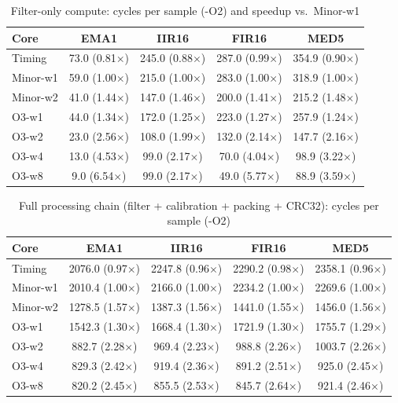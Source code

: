 \documentclass[12pt, a4paper]{article}
\begin{document}
\begin{table}[h!]
\centering
\caption{Filter-only compute: cycles per sample (-O2) and speedup vs.\ Minor-w1}
\vspace{0.2cm}
\begin{tabular}{@{}lcccc@{}}
\toprule
\textbf{Core} & \textbf{EMA1} & \textbf{IIR16} & \textbf{FIR16} & \textbf{MED5} \\ \midrule
Timing   & 73.0 (0.81$\times$) & 245.0 (0.88$\times$) & 287.0 (0.99$\times$) & 354.9 (0.90$\times$) \\
Minor-w1 & 59.0 (1.00$\times$) & 215.0 (1.00$\times$) & 283.0 (1.00$\times$) & 318.9 (1.00$\times$) \\
Minor-w2 & 41.0 (1.44$\times$) & 147.0 (1.46$\times$) & 200.0 (1.41$\times$) & 215.2 (1.48$\times$) \\
O3-w1    & 44.0 (1.34$\times$) & 172.0 (1.25$\times$) & 223.0 (1.27$\times$) & 257.9 (1.24$\times$) \\
O3-w2    & 23.0 (2.56$\times$) & 108.0 (1.99$\times$) & 132.0 (2.14$\times$) & 147.7 (2.16$\times$) \\
O3-w4    & 13.0 (4.53$\times$) &  99.0 (2.17$\times$) &  70.0 (4.04$\times$) &  98.9 (3.22$\times$) \\
O3-w8    &  9.0 (6.54$\times$) &  99.0 (2.17$\times$) &  49.0 (5.77$\times$) &  88.9 (3.59$\times$) \\ \bottomrule
\end{tabular}
\end{table}

\begin{table}[h!]
\centering
\caption{Full processing chain (filter + calibration + packing + CRC32): cycles per sample (-O2)}
\vspace{0.2cm}
\begin{tabular}{@{}lcccc@{}}
\toprule
\textbf{Core} & \textbf{EMA1} & \textbf{IIR16} & \textbf{FIR16} & \textbf{MED5} \\ \midrule
Timing   & 2076.0 (0.97$\times$) & 2247.8 (0.96$\times$) & 2290.2 (0.98$\times$) & 2358.1 (0.96$\times$) \\
Minor-w1 & 2010.4 (1.00$\times$) & 2166.0 (1.00$\times$) & 2234.2 (1.00$\times$) & 2269.6 (1.00$\times$) \\
Minor-w2 & 1278.5 (1.57$\times$) & 1387.3 (1.56$\times$) & 1441.0 (1.55$\times$) & 1456.0 (1.56$\times$) \\
O3-w1    & 1542.3 (1.30$\times$) & 1668.4 (1.30$\times$) & 1721.9 (1.30$\times$) & 1755.7 (1.29$\times$) \\
O3-w2    &  882.7 (2.28$\times$) &  969.4 (2.23$\times$) &  988.8 (2.26$\times$) & 1003.7 (2.26$\times$) \\
O3-w4    &  829.3 (2.42$\times$) &  919.4 (2.36$\times$) &  891.2 (2.51$\times$) &  925.0 (2.45$\times$) \\
O3-w8    &  820.2 (2.45$\times$) &  855.5 (2.53$\times$) &  845.7 (2.64$\times$) &  921.4 (2.46$\times$) \\ \bottomrule
\end{tabular}
\end{table}
\end{document}
